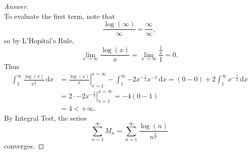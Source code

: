 \documentclass[12pt]{article}
\newcommand\paren[1]{\left( #1 \right)}
\renewcommand{\i}[4]{\int_{#1}^{#2} {#3} \, \mathrm{d} {#4} }
\theoremstyle{definition}
\begin{document}
\begin{proof}[Answer]
\[    \]
    To evaluate the first term, note that 
    \[
        \frac{\log(\infty)}{\infty} = \frac{\infty}{\infty} , 
    \]
    so by L'Hopital's Rule, 
    \[
        \lim\limits_{x \to \infty} \frac{\log(x)}{x} = \lim\limits_{x \to \infty} \frac{ \frac{1}{x} }{1} = 0 . 
    \]
    Thus 
    \begin{align*}
        \i{1}{\infty}{ \frac{\log(x)}{x^{\frac{3}{2}}} }{x} & = \left. \frac{\log(x)}{x} \right|_{x = 1}^{x = \infty} - \i{1}{\infty}{-2 x^{-\frac{1}{2}} x^{-1} }{x} = (0 - 0) + 2 \i{1}{\infty}{x^{-\frac{3}{2}}}{x} \\ 
        & = 2 \cdot \left. -2 x^{-\frac{1}{2}} \right|_{x = 1}^{x = \infty} = -4 \paren{0 - 1} \\ 
        & = 4 < +\infty .
    \end{align*}
    By Integral Test, the series 
    \[
        \sum\limits_{n = 1}^{\infty} M_n = \sum\limits_{n = 1}^{\infty} \frac{\log(n)}{n^{\frac{3}{2}}}
    \]
    converges. 
\end{proof}
\end{document}
